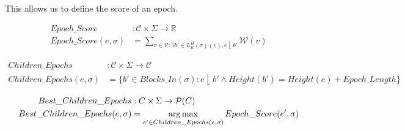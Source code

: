 This allows us to define the score of an epoch.
\begin{defn}
\begin{align*}
  Epoch\_Score&: \mathcal{C} \times \Sigma \to \mathbb{R} \\
  Epoch\_Score(e, \sigma) &= \sum_{v \in \mathcal{V} : \exists b' \in L^H_E(\sigma)(v), e \downharpoonright b'} \mathcal{W}(v)
\end{align*}
\end{defn}

\begin{defn}
\begin{align*}
  Children\_Epochs&: \mathcal{C} \times \Sigma \to \mathcal{C} \\
  Children\_Epochs(e, \sigma) &= \{b' \in Blocks\_In(\sigma): e \downharpoonright b' \land Height(b') = Height(e) + Epoch\_Length\}
\end{align*}
\end{defn}


\begin{defn}
\begin{align*}
Best\_Children\_Epochs&: C \times \Sigma \to \mathcal{P}(C)\\
Best\_Children\_Epochs(e, \sigma) &= \operatorname*{arg\,max}\limits_{e' \in Children\_Epochs(e, \sigma)} Epoch\_Score(e', \sigma)
\end{align*}
\end{defn}

